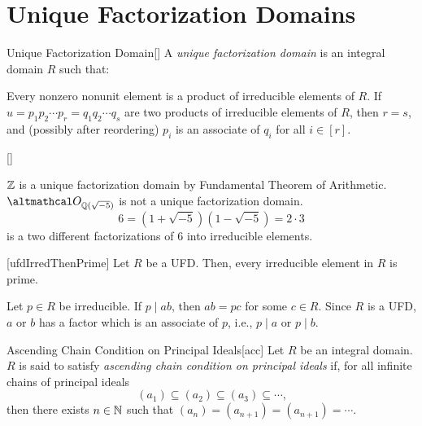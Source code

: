 \documentclass[../modern_algebra_2.tex]{subfiles}
\begin{document}
\section{Unique Factorization Domains}

\begin{Definition}{Unique Factorization Domain}[]
    A \emph{unique factorization domain} is an integral domain \(R\)
    such that:
    \begin{enumerate}[label=(\roman*)]
        \ii
        Every nonzero nonunit element
        is a product of irreducible elements of \(R\).
        \ii
        If \(u = p_1 p_2 \cdots p_r = q_1 q_2 \cdots q_s\)
        are two products of irreducible elements of \(R\),
        then \(r = s\), and (possibly after reordering)
        \(p_i\) is an associate of \(q_i\) for all \(i \in [r]\).
    \end{enumerate}
\end{Definition}

\begin{Example}{}[]
\begin{enumerate}[label=(\roman*), ref=\protect{(\roman*)}, listparindent=\parindent]
    \ii
    \(\ZZ\) is a unique factorization domain by Fundamental Theorem of Arithmetic.
    \ii
    \(\mcal{O}_{\QQ(\sqrt{-5})}\) is not a unique factorization domain.
    \[
        6 = (1+\sqrt{-5})(1-\sqrt{-5}) = 2 \cdot 3
    \]
    is a two different factorizations of \(6\) into irreducible elements.
\end{enumerate}
\end{Example}

\begin{Theorem}{}[ufdIrredThenPrime]
    Let \(R\) be a UFD.
    Then, every irreducible element in \(R\) is prime.
\end{Theorem}
\begin{myproof}[Proof]
    Let \(p \in R\) be irreducible.
    If \(p \mid ab\), then \(ab = pc\) for some \(c \in R\).
    Since \(R\) is a UFD, \(a\) or \(b\) has a factor which is
    an associate of \(p\), i.e., \(p \mid a\) or \(p \mid b\).
\end{myproof}

\begin{Definition}{Ascending Chain Condition on Principal Ideals}[acc]
    Let \(R\) be an integral domain.
    \(R\) is said to satisfy \emph{ascending chain condition on principal ideals} if,
    for all infinite chains of principal ideals
    \[
        (a_1) \subseteq (a_2) \subseteq (a_3) \subseteq \cdots\text{,}
    \]
    then there exists \(n \in \NN\) such that \((a_n) = (a_{n+1}) = (a_{n+1}) = \cdots\).
\end{Definition}
\end{document}
